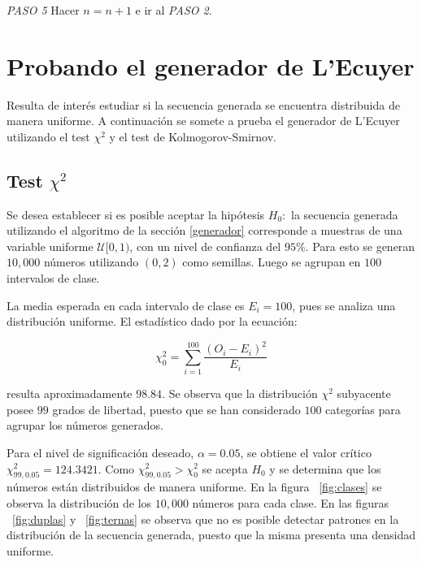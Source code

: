 \documentclass{sig-alternate}
\begin{document}
\textit{PASO 5}
Hacer $n = n + 1$ e ir al \textit{PASO 2}.

\section{Probando el generador de L'Ecuyer}\label{pruebagenerador}

Resulta de inter\'{e}s estudiar si la secuencia generada se encuentra
distribuida de manera uniforme. A continuaci\'{o}n se somete a prueba el
generador de L'Ecuyer utilizando el test $\chi^{2}$ y el test de 
Kolmogorov-Smirnov.

\subsection{Test $\chi^{2}$}\label{testchicuadrado}

Se desea establecer si es posible aceptar la hip\'{o}tesis $H_{0}:$ la secuencia
generada utilizando el algoritmo de la secci\'{o}n \ref{generador} corresponde 
a muestras de una variable uniforme $\mathcal{U}[0,1)$,
con un nivel de confianza del $95\%$. Para esto se generan $10,000$ n\'{u}meros 
utilizando $(0,2)$ como semillas. Luego se agrupan en $100$ intervalos de clase.

La media esperada en cada intervalo de clase es $E_{i} = 100$, pues se analiza 
una distribuci\'{o}n uniforme. El estad\'{i}stico dado por la ecuaci\'{o}n:

\begin{equation}\label{estadistico}
\chi^{2}_{0} = \sum_{i=1}^{100} \frac{(O_{i} - E_{i})^{2}}{E_{i}}
\end{equation}

resulta aproximadamente $98.84$.
Se observa que la distribuci\'{o}n $\chi^{2}$ subyacente posee $99$ grados de
libertad, puesto que se han considerado $100$ categor\'{i}as para agrupar los
n\'{u}meros generados.

Para el nivel de significaci\'{o}n deseado, $\alpha = 0.05$, se obtiene el
valor cr\'{i}tico $\chi^{2}_{99,0.05} = 124.3421$. Como 
$\chi^{2}_{99,0.05} > \chi^{2}_{0}$ se acepta $H_{0}$ y se determina que
los n\'{u}meros est\'{a}n distribuidos de manera uniforme. En la figura
~\ref{fig:clases} se observa la distribuci\'{o}n de los $10,000$ n\'{u}meros para
cada clase. En las figuras ~\ref{fig:duplas} y ~\ref{fig:ternas} se observa que no es
posible detectar patrones en la distribuci\'{o}n de la secuencia generada, puesto
que la misma presenta una densidad uniforme.
\end{document}
